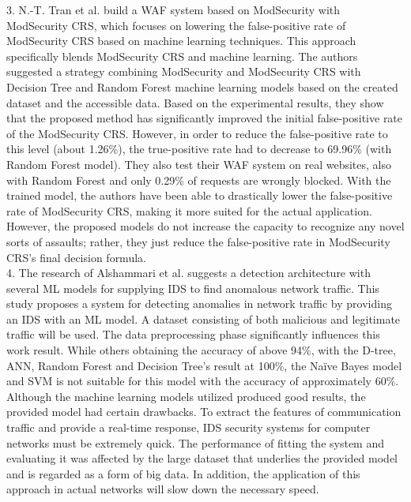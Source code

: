 3.	N.-T. Tran et al. \cite{Tin} build a WAF system based on ModSecurity with ModSecurity CRS, which focuses on lowering the false-positive rate of ModSecurity CRS based on machine learning techniques. This approach specifically blends ModSecurity CRS and machine learning. The authors suggested a strategy combining ModSecurity and ModSecurity CRS with Decision Tree and Random Forest machine learning models based on the created dataset and the accessible data. Based on the experimental results, they show that the proposed method has signiﬁcantly improved the initial false-positive rate of the ModSecurity CRS. However, in order to reduce the false-positive rate to this level (about 1.26\%), the true-positive rate had to decrease to 69.96\% (with Random Forest model). They also test their WAF system on real websites, also with Random Forest and only 0.29\% of requests are wrongly blocked. With the trained model, the authors have been able to drastically lower the false-positive rate of ModSecurity CRS, making it more suited for the actual application. However, the proposed models do not increase the capacity to recognize any novel sorts of assaults; rather, they just reduce the false-positive rate in ModSecurity CRS's final decision formula.\\
4.	The research of Alshammari et al.\cite{Alshammari} suggests a detection architecture with several ML models for supplying IDS to find anomalous network traffic. This study proposes a system for detecting anomalies in network traffic by providing an IDS with an ML model. A dataset consisting of both malicious and legitimate traffic will be used. The data preprocessing phase significantly influences this work result. While others obtaining the accuracy of above 94\%, with the D-tree, ANN, Random Forest and Decision Tree's result at 100\%, the Naïve Bayes model and SVM is not suitable for this model with the accuracy of approximately 60\%. Although the machine learning models utilized produced good results, the provided model had certain drawbacks. To extract the features of communication traffic and provide a real-time response, IDS security systems for computer networks must be extremely quick. The performance of fitting the system and evaluating it was affected by the large dataset that underlies the provided model and is regarded as a form of big data. In addition, the application of this approach in actual networks will slow down the necessary speed.\\
